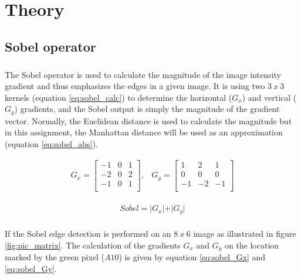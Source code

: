 \chapter{Theory}
\label{chap:theory}

\section{Sobel operator}
\label{sec:Sobel}
\paragraph*{}
The Sobel operator is used to calculate the magnitude of the image intensity gradient and thus emphasizes the edges in a given image. It is using two $3~x~3$ kernels (equation \ref{eq:sobel_calc}) to determine the horizontal ($G_x$) and vertical ($G_y$) gradients, and the Sobel output is simply the magnitude of the gradient vector.
Normally, the Euclidean distance is used to calculate the magnitude but in this assignment, the Manhattan distance will be used  as an approximation (equation \ref{eq:sobel_abs}).

\begin{equation}
\begin{array}{cc}
G_x = \left[ 
\begin{array}{ccc}
	-1 & 0 & 1\\
    -2 & 0 & 2\\
    -1 & 0 & 1\\
\end{array} \right],  &
G_y = \left[ 
\begin{array}{ccc}
	1 & 2 & 1\\
    0 & 0 & 0\\
    -1 & -2 & -1\\
\end{array}
\right]
\end{array}
\label{eq:sobel_calc}
\end{equation}\\

\begin{equation}
	Sobel = \vert G_x\vert + \vert G_y\vert
	\label{eq:sobel_abs}
\end{equation}

\paragraph*{}
If the Sobel edge detection is performed on an $8~x~6$ image as illustrated in figure \ref{fig:pic_matrix}. 
The calculation of the gradients $G_x$ and $G_y$ on the location marked by the green pixel ($A10$) is given by equation \ref{eq:sobel_Gx} and \ref{eq:sobel_Gy}.

